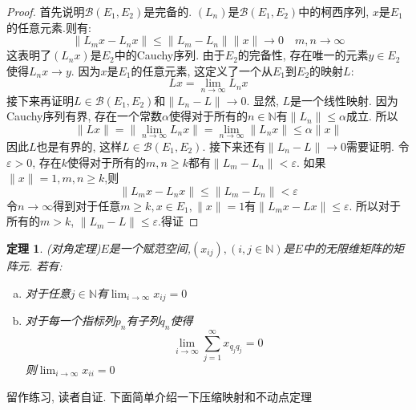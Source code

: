 \documentclass[a4paper,11pt]{book}
\newtheorem{theorem}{\hspace{2em}定理}[section]
\newtheorem{proof}{证明}[section]
\begin{document}
\begin{proof}
  首先说明$\mathcal{B}(E_1,E_2)$是完备的. $(L_n)$是$\mathcal{B}(E_1,E_2)$中的柯西序列, $x$是$E_1$的任意元素.则有:
  \begin{equation*}
    \|L_mx-L_nx\|\leq\|L_m-L_n\|\|x\|\to 0\quad m,n\to\infty
  \end{equation*}
  这表明了$(L_nx)$是$E_2$中的Cauchy序列. 由于$E_2$的完备性, 存在唯一的元素$y\in E_2$使得$L_nx\to y$. 因为$x$是$E_1$的任意元素, 这定义了一个从$E_1$到$E_2$的映射$L$:
  \begin{equation*}
    Lx=\lim_{n\to\infty}L_nx
  \end{equation*}
  接下来再证明$L\in\mathcal{B}(E_1,E_2)$和$\|L_n-L\|\to 0$.
  显然, $L$是一个线性映射. 因为Cauchy序列有界, 存在一个常数$\alpha$使得对于所有的$n\in \mathbb{N}$有$\|L_n\|\leq\alpha$成立. 所以
  \begin{equation*}
    \|Lx\|=\|\lim_{n\to\infty}L_nx\|=\lim_{n\to\infty}\|L_nx\|\leq\alpha\|x\|
  \end{equation*}
  因此$L$也是有界的, 这样$L\in\mathcal{B}(E_1,E_2)$. 接下来还有$\|L_n-L\|\to0$需要证明. 令$\varepsilon>0$, 存在$k$使得对于所有的$m,n\geq k$都有$\|L_m-L_n\|<\varepsilon$. 如果$\|x\|=1,m,n\geq k$,则
  \begin{equation*}
    \|L_mx-L_nx\|\leq\|L_m-L_n\|<\varepsilon
  \end{equation*}
  令$n\to\infty$得到对于任意$m\geq k,x\in E_1,\|x\|=1$有$\|L_mx-Lx\|\leq\varepsilon$. 所以对于所有的$m>k$, $\|L_m-L\|\leq\varepsilon$.得证
\end{proof}
\begin{theorem}
  (对角定理)$E$是一个赋范空间,$(x_{ij}),(i,j\in \mathbb{N})$是$E$中的无限维矩阵的矩阵元. 若有:
  \begin{enumerate}[(a)]
    \item 对于任意$j\in \mathbb{N}$有$\lim_{i\to\infty}x_{ij}=0$
    \item 对于每一个指标列$p_n$有子列$q_n$使得
    \begin{equation*}
      \lim_{i\to\infty}\sum_{j=1}^{\infty}x_{q_jq_j}=0
    \end{equation*}
    则$\lim_{i\to\infty}x_{ii}=0$
  \end{enumerate}
\end{theorem}
留作练习, 读者自证. 下面简单介绍一下压缩映射和不动点定理
\end{document}
